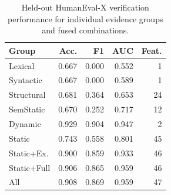 \begin{table}[!htbp]
\centering
\scriptsize
\begin{tabular}{lrrrr}
\toprule
Group & Acc. & F1 & AUC & Feat. \\
\midrule
Lexical & 0.667 & 0.000 & 0.552 & 1 \\
Syntactic & 0.667 & 0.000 & 0.589 & 1 \\
Structural & 0.681 & 0.364 & 0.653 & 24 \\
SemStatic & 0.670 & 0.252 & 0.717 & 12 \\
Dynamic & 0.929 & 0.904 & 0.947 & 2 \\
Static & 0.743 & 0.558 & 0.801 & 45 \\
Static+Ex. & 0.900 & 0.859 & 0.933 & 46 \\
Static+Full & 0.906 & 0.865 & 0.959 & 46 \\
All & 0.908 & 0.869 & 0.959 & 47 \\
\bottomrule
\end{tabular}
\vspace{0.5em}
\caption{Held-out HumanEval-X verification performance for individual evidence groups and fused combinations.}
\label{tab:evidence-group-results}
\end{table}
